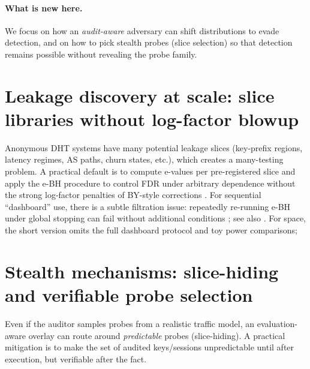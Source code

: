 \documentclass[11pt]{article}
\begin{document}
\paragraph{What is new here.}
We focus on how an \emph{audit-aware} adversary can shift distributions to evade detection, and on how to pick stealth probes (slice selection) so that detection remains possible without revealing the probe family.

\section{Leakage discovery at scale: slice libraries without log-factor blowup}
Anonymous DHT systems have many potential leakage slices (key-prefix regions, latency regimes, AS paths, churn states, etc.), which creates a many-testing problem.
A practical default is to compute e-values per pre-registered slice and apply the e-BH procedure \cite{wangramdas2022ebh} to control FDR under arbitrary dependence without the strong log-factor penalties of BY-style corrections \cite{benjamini2001by}.
For sequential ``dashboard'' use, there is a subtle filtration issue: repeatedly re-running e-BH under global stopping can fail without additional conditions \cite{stopped_ebh_2025}; see also \cite{xu2024online_evalues}.
For space, the short version omits the full dashboard protocol and toy power comparisons; 

\section{Stealth mechanisms: slice-hiding and verifiable probe selection}
Even if the auditor samples probes from a realistic traffic model, an evaluation-aware overlay can route around \emph{predictable} probes (slice-hiding).
A practical mitigation is to make the set of audited keys/sessions unpredictable until after execution, but verifiable after the fact.
\end{document}
